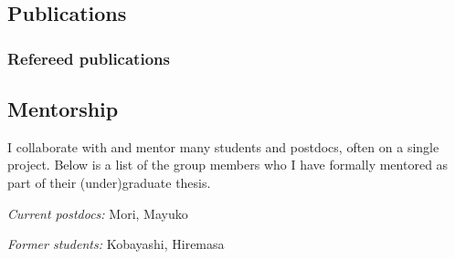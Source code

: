 \documentclass[12pt,letterpaper]{article}
\begin{document}
%   

\ifdefined\withpubs
  \subsection{Publications}
  

  \subsubsection{Refereed publications}
  \begin{list}{}{\cvlist}
    
  \end{list}

\fi

\subsection{Mentorship}

I collaborate with and mentor many students and postdocs, often on a single
project.
Below is a list of the group members who I have formally mentored as part of their (under)graduate thesis.

\begin{list}{}{\cvlist}
\item \emph{Current postdocs:}
  Mori, Mayuko
\item \emph{Former students:}
  Kobayashi, Hiremasa
\end{list}


\end{document}
